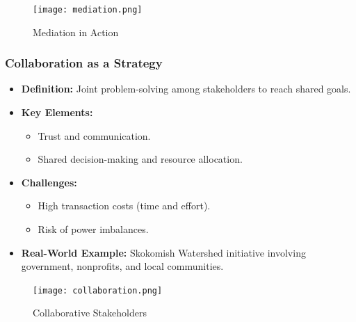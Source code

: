 \documentclass[10pt]{beamer}
\begin{document}
\begin{frame}
\begin{frame}
        \begin{figure}
            \centering
            \texttt{[image: mediation.png]}
            \caption{Mediation in Action}
        \end{figure}
        \end{frame}
        
        \begin{frame}
        \frametitle{Collaboration as a Strategy}
        \begin{itemize}
            \item \textbf{Definition:} Joint problem-solving among stakeholders to reach shared goals.
            \item \textbf{Key Elements:}
                \begin{itemize}
                    \item Trust and communication.
                    \item Shared decision-making and resource allocation.
                \end{itemize}
            \item \textbf{Challenges:}
                \begin{itemize}
                    \item High transaction costs (time and effort).
                    \item Risk of power imbalances.
                \end{itemize}
            \item \textbf{Real-World Example:} Skokomish Watershed initiative involving government, nonprofits, and local communities.
        \end{itemize}
        
        \begin{figure}
            \centering
            \texttt{[image: collaboration.png]}
            \caption{Collaborative Stakeholders}
        \end{figure}
        \end{frame}
        

\end{frame}
\end{document}

